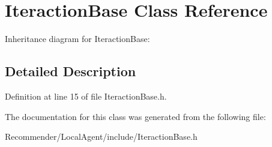 \section{IteractionBase Class Reference}
\label{classbr_1_1ufscar_1_1lince_1_1ginga_1_1recommender_1_1IteractionBase}
Inheritance diagram for IteractionBase:

\subsection{Detailed Description}




Definition at line 15 of file IteractionBase.h.

The documentation for this class was generated from the following file:\begin{CompactItemize}
\item 
Recommender/LocalAgent/include/IteractionBase.h\end{CompactItemize}
